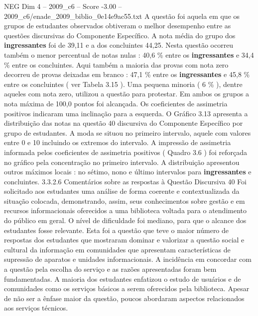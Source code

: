 \begin{textsample}{NEG Dim 4 – 2009\_c6 – Score -3.00 – 2009\_c6/enade\_2009\_biblio\_0e14e9ac55.txt}
A questão foi aquela em que os grupos de estudantes observados obtiveram o melhor desempenho entre as questões discursivas do Componente Específico.
A nota média do grupo dos \textbf{ingressantes} foi de 39,11 e a dos concluintes 44,25.
Nesta questão ocorreu também o menor percentual de notas nulas : 40,6 \% entre os \textbf{ingressantes} e 34,4 \% entre os concluintes.
Aqui também a maioria das provas com nota zero decorreu de provas deixadas em branco : 47,1 \% entre os \textbf{ingressantes} e 45,8 \% entre os concluintes ( ver Tabela 3.15 ).
Uma pequena minoria ( 6 \% ), dentre aqueles com nota zero, utilizou a questão para protestar.
Em ambos os grupos a nota máxima de 100,0 pontos foi alcançada.
Os coeficientes de assimetria positivos indicaram uma inclinação para a esquerda.
O Gráfico 3.13 apresenta a distribuição das notas na questão 40 discursiva do Componente Específico por grupo de estudantes.
A moda se situou no primeiro intervalo, aquele com valores entre 0 e 10 incluindo os extremos do intervalo.
A impressão de assimetria informada pelos coeficientes de assimetria positivos ( Quadro 3.6 ) foi reforçada no gráfico pela concentração no primeiro intervalo.
A distribuição apresentou outros máximos locais : no sétimo, nono e último intervalos para \textbf{ingressantes} e concluintes. 3.3.2.6 Comentários sobre as respostas à Questão Discursiva 40 Foi solicitado aos estudantes uma análise de forma coerente e contextualizada da situação colocada, demonstrando, assim, seus conhecimentos sobre gestão e em recursos informacionais oferecidos a uma biblioteca voltada para o atendimento do público em geral.
O nível de dificuldade foi mediano, para que o alcance dos estudantes fosse relevante.
Esta foi a questão que teve o maior número de respostas dos estudantes que mostraram dominar e valorizar a questão social e cultural da informação em comunidades que apresentam características de supressão de aparatos e unidades informacionais.
A incidência em concordar com a questão pela escolha do serviço e as razões apresentadas foram bem fundamentadas.
A maioria dos estudantes enfatizou o estudo de usuários e de comunidades como os serviços básicos a serem oferecidos pela biblioteca.
Apesar de não ser a ênfase maior da questão, poucos abordaram aspectos relacionados aos serviços técnicos.

\end{textsample}
